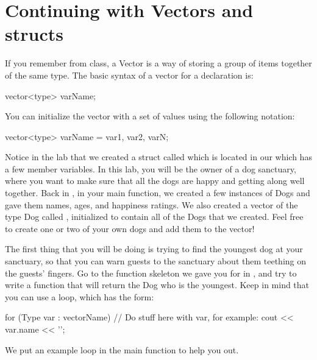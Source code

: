 \documentclass{tufte-handout}
\begin{document}
\section{Continuing with Vectors and structs}
If you remember from class, a Vector is a way of storing a group of items together of the same type.  The basic syntax of a vector for a declaration is:
\begin{Code}
vector<type> varName;
\end{Code}

You can initialize the vector with a set of values using the following notation:
\begin{Code}
vector<type> varName = {var1, var2, varN};
\end{Code}

Notice in the lab that we created a struct called  which is
located in our  which has a few member variables.
In this lab, you will be the owner of a dog sanctuary, where you want to make sure that all the dogs are happy and getting along well together.
Back in , in your main function, we created a few instances of Dogs and gave them names, ages, and happiness ratings.
We also created a vector of the type Dog called , initialized to contain all of the Dogs that we created.
Feel free to create one or two of your own dogs and add them to the vector!


The first thing that you will be doing is trying to find the youngest
dog at your sanctuary, so that you can warn guests to the sanctuary
about them teething on the guests' fingers.  Go to the function
skeleton we gave you for  in
, and try to write a function that will return the Dog who is the youngest. Keep in mind that you can use a  loop, which has the form:
\begin{Code}
    for (Type var : vectorName) {
        // Do stuff here with var, for example:
        cout << var.name << '\n';
    }
\end{Code}

We put an example  loop in the main function to help you out.
\end{document}
